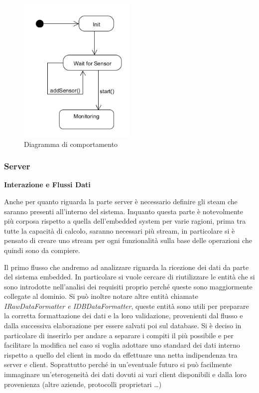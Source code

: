 \begin{figure}[H]
\centering
\includegraphics[width=0.5\textwidth]{Figures/LogicArchitecture/EmbeddedSystem/Behaviour}
\caption{Diagramma di comportamento}
\end{figure}

\subsubsection{Server}

\begin{center}
  \textbf{Interazione e Flussi Dati}
\end{center}

Anche per quanto riguarda la parte server \`e necessario definire gli steam che saranno presenti all'interno del sistema. Inquanto questa parte \`e notevolmente pi\`u corposa rispetto a quella dell'embedded system per varie ragioni, prima tra tutte la capacit\`a di calcolo, saranno necessari pi\`u stream, in particolare si \`e pensato di creare uno stream per ogni funzionalit\`a sulla base delle operazioni che quindi sono da compiere.

Il primo flusso che andremo ad analizzare riguarda la ricezione dei dati da parte del sistema embedded. In particolare si vuole cercare di riutilizzare le entit\`a che si sono introdotte nell'analisi dei requisiti proprio perch\'e queste sono maggiormente collegate al dominio. Si pu\`o inoltre notare altre entit\`a chiamate \textit{IRawDataFormatter e IDBDataFormatter}, queste entit\`a sono utili per preparare la corretta formattazione dei dati e la loro validazione, provenienti dal flusso e dalla successiva elaborazione per essere salvati poi sul database. Si \`e deciso in particolare di inserirlo per andare a separare i compiti il pi\`u possibile e per facilitare la modifica nel caso si voglia adottare uno standard dei dati interno rispetto a quello del client in modo da effettuare una netta indipendenza tra server e client. Soprattutto perch\'e in un'eventuale futuro si pu\`o facilmente immaginare un'eterogeneit\`a dei dati dovuti ai vari client disponibili e dalla loro provenienza (altre aziende, protocolli proprietari \ldots)

